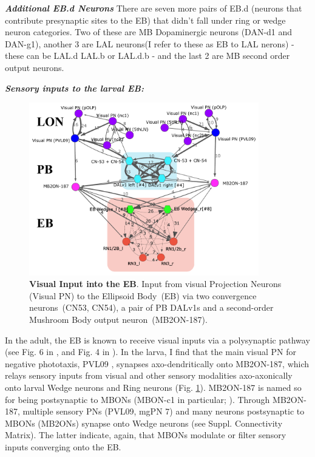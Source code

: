     \textbf{\textit{Additional EB.d Neurons}}
    There are seven more pairs of EB.d (neurons that contribute presynaptic sites to the EB) that didn't fall under ring or wedge neuron categories. Two of these are MB Dopaminergic neurons (DAN-d1 and DAN-g1), another 3 are LAL neurons(I refer to these as EB to LAL nerons) - these can be LAL.d LAL.b or LAL.d.b - and the last 2 are MB second order output neurons. %


    \textbf{\textit{Sensory inputs to the larval EB:}}

        \begin{figure}
            \centering
            \includegraphics[width=10cm]{Figs/CX/visualPNstoPBEB.pdf}
            \caption{\textbf{Visual Input into the EB}. Input from visual Projection Neurons (Visual PN) to the Ellipsoid Body~(EB) via two convergence neurons~(CN53, CN54), a pair of PB DALv1s and a second-order Mushroom Body output neuron~(MB2ON-187).}
            \label{visualPBEB}
        \end{figure}
        
    In the adult, the EB is known to receive visual inputs via a polysynaptic pathway (see Fig. 6 in \citep{hulse2021connectome}, and Fig. 4 in \citep{omoto2018neuronal}).
    In the larva, I find that the main visual PN for negative phototaxis, PVL09 \citep{Humberg2018PVL09}, synapses axo-dendritically onto MB2ON-187, which relays sensory inputs from visual and other sensory modalities axo-axonically onto larval Wedge neurons and Ring neurons (Fig. \ref{visualPBEB}).
    MB2ON-187 is named so for being postsynaptic to MBONs (MBON-c1 in particular; \citep{eschbach2021circuits}).
    Through MB2ON-187, multiple sensory PNs (PVL09, mgPN 7) and many neurons postsynaptic to MBONs (MB2ONs) synapse onto Wedge neurons (see Suppl. Connectivity Matrix).
    The latter indicate, again, that MBONs modulate or filter sensory inputs converging onto the EB.



